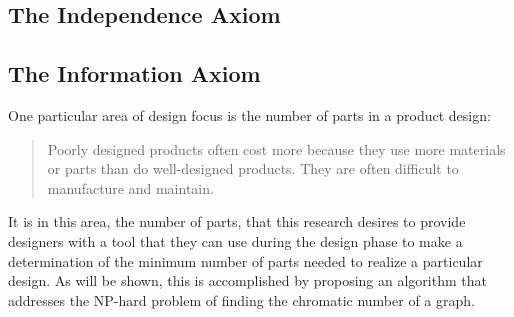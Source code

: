 \subsection{The Independence Axiom}

\subsection{The Information Axiom}

One particular area of design focus is the number of parts in a product design:
\begin{quote}
  Poorly designed products often cost more because they use more materials or parts than do well-designed products.
  They are often difficult to manufacture and maintain.
\end{quote}
It is in this area, the number of parts, that this research desires to provide designers with a tool that they can
use during the design phase to make a determination of the minimum number of parts needed to realize a particular
design.  As will be shown, this is accomplished by proposing an algorithm that addresses the NP-hard problem of
finding the chromatic number of a graph.

